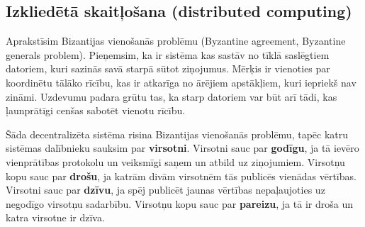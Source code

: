 \subsection{Izkliedētā skaitļošana (distributed computing)}
Aprakstīsim Bizantijas vienošanās problēmu (Byzantine agreement, Byzantine generals problem).
Pieņemsim, ka ir sistēma kas sastāv no tīklā saslēgtiem datoriem, kuri sazinās savā starpā sūtot ziņojumus. Mērķis ir vienoties par koordinētu tālāko rīcību, kas ir atkarīga no ārējiem apstākļiem, kuri iepriekš nav zināmi. Uzdevumu padara grūtu tas, ka starp datoriem var būt arī tādi, kas ļaunprātīgi cenšas sabotēt vienotu rīcību.

Šāda decentralizēta sistēma risina Bizantijas vienošanās problēmu, tapēc katru sistēmas dalībnieku sauksim par \textbf{virsotni}.
Virsotni sauc par \textbf{godīgu}, ja tā ievēro vienprātības protokolu un veiksmīgi saņem un atbild uz ziņojumiem.
Virsotņu kopu sauc par \textbf{drošu}, ja katrām divām virsotnēm tās publicēs vienādas vērtības.
Virsotni sauc par \textbf{dzīvu}, ja spēj publicēt jaunas vērtības nepaļaujoties uz negodīgo virsotņu sadarbību.
Virsotņu kopu sauc par \textbf{pareizu}, ja tā ir droša un katra virsotne ir dzīva.




